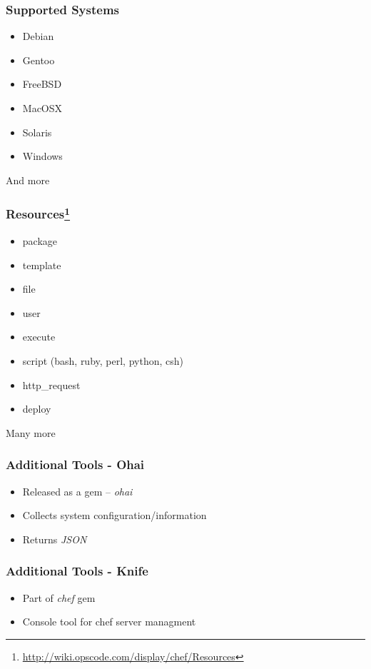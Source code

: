 \documentclass[16pt]{beamer}
\begin{document}
\begin{frame}
  \frametitle{Supported Systems}
  \begin{itemize}
    \item Debian
    \item Gentoo
    \item FreeBSD
    \item MacOSX
    \item Solaris
    \pause
    \item Windows
  \end{itemize}
  \pause
  \begin{center}
    \large And more
  \end{center}
\end{frame}

\begin{frame}
  \frametitle{Resources\footnote{\url{http://wiki.opscode.com/display/chef/Resources}}}
  \begin{itemize}
    \item package
    \item template
    \item file
    \item user
    \item execute
    \item script (bash, ruby, perl, python, csh)
    \item http\_request
    \item deploy
  \end{itemize}
  \pause
  \begin{center}
    \large Many more
  \end{center}
\end{frame}

\begin{frame}
  \frametitle{Additional Tools - Ohai}
  \begin{itemize}
    \item Released as a gem -- \emph{ohai}
    \item Collects system configuration/information
    \item Returns \emph{JSON}
  \end{itemize}
\end{frame}

\begin{frame}
  \frametitle{Additional Tools - Knife}
  \begin{itemize}
    \item Part of \emph{chef} gem
    \item Console tool for chef server managment
  \end{itemize}
\end{frame}
\end{document}
